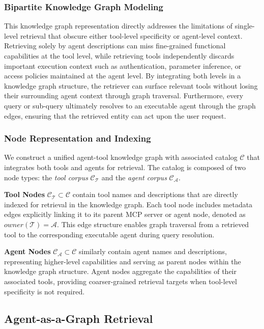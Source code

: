 \documentclass[a4paper,twoside]{article}
\begin{document}
\subsubsection{Bipartite Knowledge Graph Modeling}

This knowledge graph representation directly addresses the limitations of single-level retrieval that obscure either tool-level specificity or agent-level context. Retrieving solely by agent descriptions can miss fine-grained functional capabilities at the tool level, while retrieving tools independently discards important execution context such as authentication, parameter inference, or access policies maintained at the agent level. By integrating both levels in a knowledge graph structure, the retriever can surface relevant tools without losing their surrounding agent context through graph traversal. Furthermore, every query or sub-query ultimately resolves to an executable agent through the graph edges, ensuring that the retrieved entity can act upon the user request.

\subsubsection{Node Representation and Indexing}

We construct a unified agent-tool knowledge graph with associated catalog \(\mathcal{C}\) that integrates both tools and agents for retrieval. The catalog is composed of two node types: the \emph{tool corpus} \(\mathcal{C_T}\) and the \emph{agent corpus} \(\mathcal{C_A}\).

\textbf{Tool Nodes} \(\mathcal{C_T} \subset \mathcal{C}\) contain tool names and descriptions that are directly indexed for retrieval in the knowledge graph. Each tool node includes metadata edges explicitly linking it to its parent MCP server or agent node, denoted as \(owner(\mathcal{T}) = \mathcal{A}\). This edge structure enables graph traversal from a retrieved tool to the corresponding executable agent during query resolution.

\textbf{Agent Nodes} \(\mathcal{C_A} \subset \mathcal{C}\) similarly contain agent names and descriptions, representing higher-level capabilities and serving as parent nodes within the knowledge graph structure. Agent nodes aggregate the capabilities of their associated tools, providing coarser-grained retrieval targets when tool-level specificity is not required.

\subsection{Agent-as-a-Graph Retrieval}\label{subsec:kg-retrieval}
\end{document}
